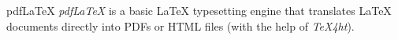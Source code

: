 \begin{definition}{pdfLaTeX} \textit{pdfLaTeX} is a basic LaTeX typesetting engine that translates LaTeX documents directly into PDFs or HTML files (with the help of \textit{TeX4ht}).\end{definition}